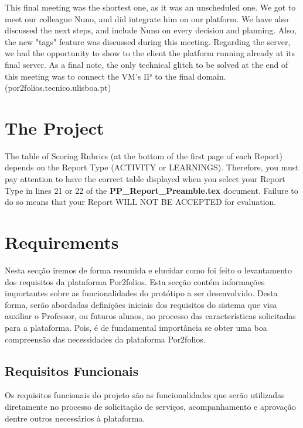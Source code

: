 \documentclass[a4paper,12pt,journal,twoside,compsoc]{PPIEEEtran}
\begin{document}
	This final meeting was the shortest one, as it was an unscheduled one. We got to meet our colleague Nuno, and did integrate him on our platform. We have also discussed the next steps, and include Nuno on every decision and planning. Also, the new "tags" feature was discussed during this meeting.
	Regarding the server, we had the opportunity to show to the client the platform running already at its final server.
	As a final note, the only technical glitch to be solved at the end of this meeting was to connect the VM's IP to the final domain.
	(por2folios.tecnico.ulisboa.pt)


\section{The Project}
The table of Scoring Rubrics (at the bottom of the first page of each Report) depends on the Report Type (ACTIVITY or LEARNINGS). Therefore, you must pay attention to have the correct table displayed when you select your Report Type in lines 21 or 22 of the \textbf{PP\_Report\_Preamble.tex} document. Failure to do so means that your Report WILL NOT BE ACCEPTED for evaluation.


\section{Requirements}

Nesta secção iremos de forma resumida e elucidar como foi feito o levantamento dos requisitos da plataforma Por2folios. Esta secção contém informações importantes sobre as funcionalidades do protótipo a ser desenvolvido. Desta forma, serão abordadas definições iniciais dos requisitos do sistema que visa auxiliar o Professor, ou futuros alunos, no processo das características solicitadas para a plataforma. Pois, é de fundamental importância se obter uma boa compreensão das necessidades da plataforma Por2folios.

\subsection{Requisitos Funcionais}

Os requisitos funcionais do projeto são as funcionalidades que serão utilizadas diretamente no processo de solicitação de serviços, acompanhamento e aprovação dentre outros necessários à plataforma.
\end{document}
